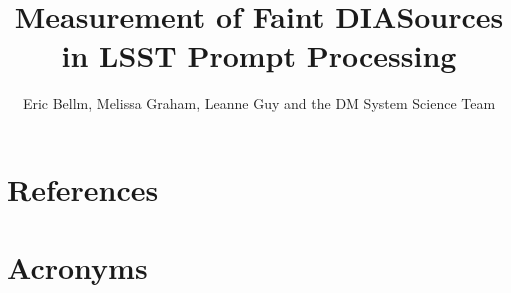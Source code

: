 \documentclass[DM,authoryear,toc]{lsstdoc}
\title{Measurement of Faint DIASources in LSST Prompt Processing}
\author{%
Eric Bellm, Melissa Graham, Leanne Guy and the DM System Science Team
}
\date{\vcsDate}
\begin{document}
\maketitle








\appendix
\section{References} \label{sec:bib}
\renewcommand{\refname}{} %


\section{Acronyms} \label{sec:acronyms}

\end{document}
